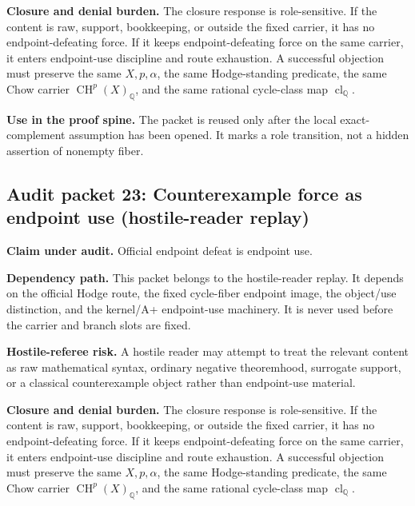 \documentclass[11pt]{article}
\newcommand{\QQ}{\mathbb{Q}}
\newcommand{\CH}{\operatorname{CH}}
\newcommand{\clQ}{\operatorname{cl}_{\QQ}}
\begin{document}
\par\noindent\textbf{Closure and denial burden.} The closure response is role-sensitive. If the content is raw, support, bookkeeping, or outside the fixed carrier, it has no endpoint-defeating force. If it keeps endpoint-defeating force on the same carrier, it enters endpoint-use discipline and route exhaustion. A successful objection must preserve the same $X,p,\alpha$, the same Hodge-standing predicate, the same Chow carrier $\CH^p(X)_\QQ$, and the same rational cycle-class map $\clQ$.


\par\noindent\textbf{Use in the proof spine.} The packet is reused only after the local exact-complement assumption has been opened. It marks a role transition, not a hidden assertion of nonempty fiber.


\subsection{Audit packet 23: Counterexample force as endpoint use (hostile-reader replay)}


\par\noindent\textbf{Claim under audit.} Official endpoint defeat is endpoint use.


\par\noindent\textbf{Dependency path.} This packet belongs to the hostile-reader replay. It depends on the official Hodge route, the fixed cycle-fiber endpoint image, the object/use distinction, and the kernel/A+ endpoint-use machinery. It is never used before the carrier and branch slots are fixed.


\par\noindent\textbf{Hostile-referee risk.} A hostile reader may attempt to treat the relevant content as raw mathematical syntax, ordinary negative theoremhood, surrogate support, or a classical counterexample object rather than endpoint-use material.


\par\noindent\textbf{Closure and denial burden.} The closure response is role-sensitive. If the content is raw, support, bookkeeping, or outside the fixed carrier, it has no endpoint-defeating force. If it keeps endpoint-defeating force on the same carrier, it enters endpoint-use discipline and route exhaustion. A successful objection must preserve the same $X,p,\alpha$, the same Hodge-standing predicate, the same Chow carrier $\CH^p(X)_\QQ$, and the same rational cycle-class map $\clQ$.
\end{document}
